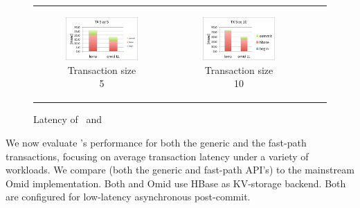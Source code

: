 \begin{figure}[]
\begin{tabular}{cccc}
    \begin{subfigure}[t]{0.4\textwidth}
	\includegraphics[width=\textwidth]{figs/lorravslltx5.pdf}
    \caption[]{Transaction size 5}
    \label{fig:latency:read}
    \label{fig:latency:lorra5}
  \end{subfigure} &

  \begin{subfigure}[t]{0.4\textwidth}
	\includegraphics[width=\textwidth]{figs/lorravslltx10.pdf}
    \caption[]{Transaction size 10}
    \label{fig:latency:lorra10}
  \end{subfigure} \\
  
    
  \end{tabular}
  \caption{Latency of \sys\ and \sysll\ }
\end{figure}

We now evaluate {\sys}'s performance for both the generic and the fast-path transactions, 
focusing on average transaction latency under a variety of workloads. We compare {\sys\/} 
(both the generic and fast-path API's) to the mainstream Omid implementation. Both {\sys\/} 
and Omid use HBase as KV-storage backend. Both are configured for low-latency asynchronous 
post-commit.   

